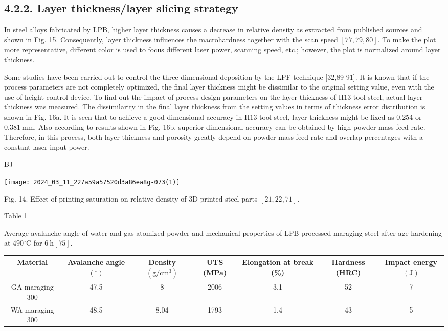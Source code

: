 \documentclass[10pt]{article}
\begin{document}
\subsection*{4.2.2. Layer thickness/layer slicing strategy}
In steel alloys fabricated by LPB, higher layer thickness causes a decrease in relative density as extracted from published sources and shown in Fig. 15. Consequently, layer thickness influences the macrohardness together with the scan speed $[77,79,80]$. To make the plot more representative, different color is used to focus different laser power, scanning speed, etc.; however, the plot is normalized around layer thickness.

Some studies have been carried out to control the three-dimensional deposition by the LPF technique [32,89-91]. It is known that if the process parameters are not completely optimized, the final layer thickness might be dissimilar to the original setting value, even with the use of height control device. To find out the impact of process design parameters on the layer thickness of $\mathrm{H} 13$ tool steel, actual layer thickness was measured. The dissimilarity in the final layer thickness from the setting values in terms of thickness error distribution is shown in Fig. 16a. It is seen that to achieve a good dimensional accuracy in $\mathrm{H} 13$ tool steel, layer thickness might be fixed as 0.254 or $0.381 \mathrm{~mm}$. Also according to results shown in Fig. 16b, superior dimensional accuracy can be obtained by high powder mass feed rate. Therefore, in this process, both layer thickness and porosity greatly depend on powder mass feed rate and overlap percentages with a constant laser input power.

BJ

\begin{center}
\texttt{[image: 2024\_03\_11\_227a59a57520d3a86ea8g-073(1)]}
\end{center}

Fig. 14. Effect of printing saturation on relative density of 3D printed steel parts $[21,22,71]$.

Table 1

Average avalanche angle of water and gas atomized powder and mechanical properties of LPB processed maraging steel after age hardening at $490{ }^{\circ} \mathrm{C}$ for $6 \mathrm{~h}[75]$.

\begin{center}
\begin{tabular}{|c|c|c|c|c|c|c|}
\hline
Material & Avalanche angle $\left({ }^{\circ}\right)$ & Density $\left(\mathrm{g} / \mathrm{cm}^{3}\right)$ & UTS (MPa) & Elongation at break (\%) & Hardness (HRC) & Impact energy $(\mathrm{J})$ \\
\hline
GA-maraging 300 & 47.5 & 8 & 2006 & 3.1 & 52 & 7 \\
\hline
WA-maraging 300 & 48.5 & 8.04 & 1793 & 1.4 & 43 & 5 \\
\hline
\end{tabular}
\end{center}
\end{document}
